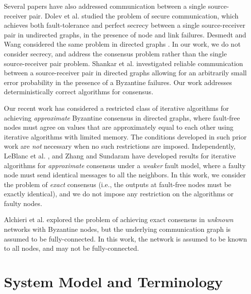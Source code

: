 \documentclass[letterpaper, 11pt]{article}
\begin{document}
Several papers have also addressed communication between a single source-receiver pair.
Dolev et al. \cite{Dolev90perfectlysecure} studied the problem of secure communication, which achieves both fault-tolerance and perfect secrecy between a single source-receiver pair in undirected graphs, in the presence of node and link failures. Desmedt and Wang considered the same problem in directed graphs \cite{yvo_eurocrypt02}. In our work, we do not consider secrecy, and address the consensus problem rather than the single source-receiver pair problem. Shankar et al. \cite{Shankar_SODA08} investigated reliable communication between a source-receiver pair in directed graphs allowing for an arbitrarily small error probability in the presence of a Byzantine failures. Our work addresses deterministically correct algorithms for consensus.

Our recent work \cite{vaidya_PODC12,Tseng_general,vaidya_incomplete} has considered a restricted class of iterative algorithms for achieving {\em approximate} Byzantine consensus in directed graphs, where fault-free nodes must agree on values that are approximately equal to each other using iterative algorithms with limited memory. The conditions developed in such prior work are {\em not} necessary when no such restrictions are imposed. Independently, LeBlanc et al. \cite{leblanc_HiCoNs,Sundaram_journal}, and Zhang and Sundaram \cite{Sundaram,Sundaram_ACC} have developed results for iterative
algorithms for {\em approximate} consensus under a {\em weaker} fault model, where a faulty node must send
identical messages to all the neighbors. In this work, we consider the problem of {\em exact} consensus (i.e., the outputs at fault-free nodes must be exactly identical), and we do not impose any restriction on the algorithms or faulty nodes.

Alchieri et al. \cite{BFT-CUP_OPODIS} explored the problem of achieving exact consensus in {\em unknown} networks with Byzantine nodes, but the underlying communication graph is assumed to be fully-connected. In this work, the network is assumed to be known to all nodes, and may not be fully-connected.


















\section{System Model and Terminology}
\label{s_term}
\end{document}
